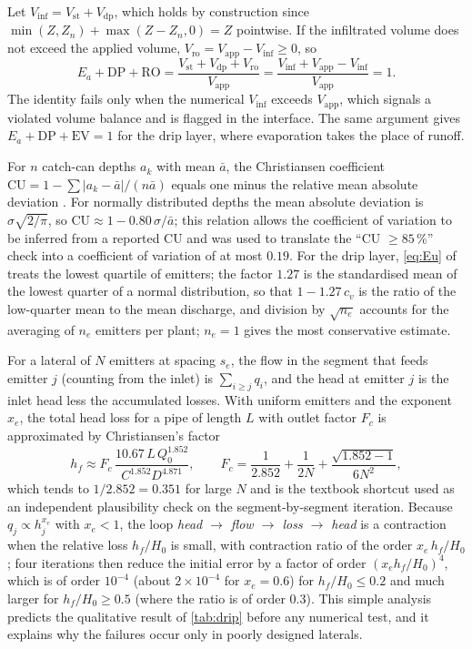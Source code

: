 \documentclass[preprint,12pt]{elsarticle}
\begin{document}
Let $V_{\mathrm{inf}}=V_{\mathrm{st}}+V_{\mathrm{dp}}$, which holds by construction since $\min(Z,Z_n)+\max(Z-Z_n,0)=Z$ pointwise. If the infiltrated volume does not exceed the applied volume, $V_{\mathrm{ro}}=V_{\mathrm{app}}-V_{\mathrm{inf}}\ge0$, so
\begin{equation}
E_a+\mathrm{DP}+\mathrm{RO}=\frac{V_{\mathrm{st}}+V_{\mathrm{dp}}+V_{\mathrm{ro}}}{V_{\mathrm{app}}}=\frac{V_{\mathrm{inf}}+V_{\mathrm{app}}-V_{\mathrm{inf}}}{V_{\mathrm{app}}}=1.
\label{eq:effclose}
\end{equation}
The identity fails only when the numerical $V_{\mathrm{inf}}$ exceeds $V_{\mathrm{app}}$, which signals a violated volume balance and is flagged in the interface. The same argument gives $E_a+\mathrm{DP}+\mathrm{EV}=1$ for the drip layer, where evaporation takes the place of runoff.

For $n$ catch-can depths $a_k$ with mean $\bar a$, the Christiansen coefficient $\mathrm{CU}=1-\sum|a_k-\bar a|/(n\bar a)$ equals one minus the relative mean absolute deviation \cite{Christiansen1942}. For normally distributed depths the mean absolute deviation is $\sigma\sqrt{2/\pi}$, so $\mathrm{CU}\approx1-0.80\,\sigma/\bar a$; this relation allows the coefficient of variation to be inferred from a reported CU and was used to translate the ``CU $\ge85$\,\%'' check into a coefficient of variation of at most $0.19$. For the drip layer, \cref{eq:Eu} of \cite{KellerKarmeli1974} treats the lowest quartile of emitters; the factor $1.27$ is the standardised mean of the lowest quarter of a normal distribution, so that $1-1.27\,c_v$ is the ratio of the low-quarter mean to the mean discharge, and division by $\sqrt{n_e}$ accounts for the averaging of $n_e$ emitters per plant; $n_e=1$ gives the most conservative estimate.

For a lateral of $N$ emitters at spacing $s_e$, the flow in the segment that feeds emitter $j$ (counting from the inlet) is $\sum_{i\ge j}q_i$, and the head at emitter $j$ is the inlet head less the accumulated losses. With uniform emitters and the exponent $x_e$, the total head loss for a pipe of length $L$ with outlet factor $F_c$ is approximated by Christiansen's factor
\begin{equation}
h_f\approx F_c\,\frac{10.67\,L\,Q_0^{1.852}}{C^{1.852}D^{4.871}},\qquad F_c=\frac1{2.852}+\frac1{2N}+\frac{\sqrt{1.852-1}}{6N^2},
\label{eq:Fc}
\end{equation}
which tends to $1/2.852=0.351$ for large $N$ and is the textbook shortcut used as an independent plausibility check on the segment-by-segment iteration. Because $q_j\propto h_j^{x_e}$ with $x_e<1$, the loop \emph{head $\to$ flow $\to$ loss $\to$ head} is a contraction when the relative loss $h_f/H_0$ is small, with contraction ratio of the order $x_e\,h_f/H_0$; four iterations then reduce the initial error by a factor of order $(x_eh_f/H_0)^4$, which is of order $10^{-4}$ (about $2\times10^{-4}$ for $x_e=0.6$) for $h_f/H_0\le0.2$ and much larger for $h_f/H_0\ge0.5$ (where the ratio is of order $0.3$). This simple analysis predicts the qualitative result of \cref{tab:drip} before any numerical test, and it explains why the failures occur only in poorly designed laterals.
\end{document}
